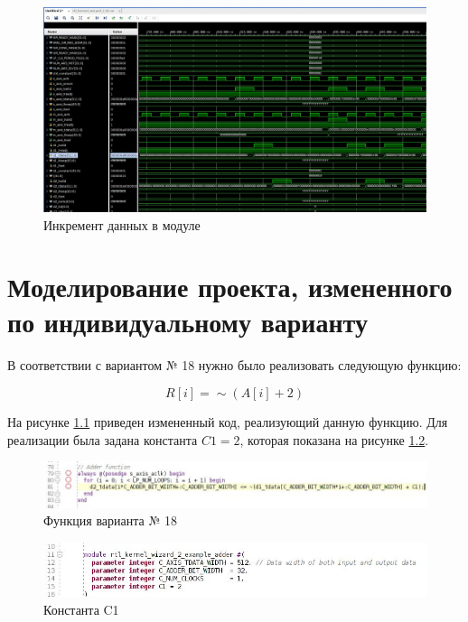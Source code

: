 \begin{figure}[H]
	\begin{center}
		\includegraphics[scale=0.3]{img/module_increment.png}
	\end{center}
	\captionsetup{justification=centering}
	\caption{Инкремент данных в модуле}
	\label{img:module_increment}
\end{figure}

\chapter{Моделирование проекта, измененного по индивидуальному варианту}

В соответствии с вариантом № 18 нужно было реализовать следующую функцию:

\begin{equation}
R[i] = \sim(A[i]+2)
\end{equation}

На рисунке \ref{img:change_func} приведен измененный код, реализующий данную функцию. Для реализации была задана константа $C1 = 2$, которая показана на рисунке \ref{img:const}.

\begin{figure}[H]
	\begin{center}
		\includegraphics[scale=0.5]{img/change_func.png}
	\end{center}
	\captionsetup{justification=centering}
	\caption{Функция варианта № 18}
	\label{img:change_func}
\end{figure}

\begin{figure}[H]
	\begin{center}
		\includegraphics[scale=0.5]{img/const.png}
	\end{center}
	\captionsetup{justification=centering}
	\caption{Константа C1}
	\label{img:const}
\end{figure}

